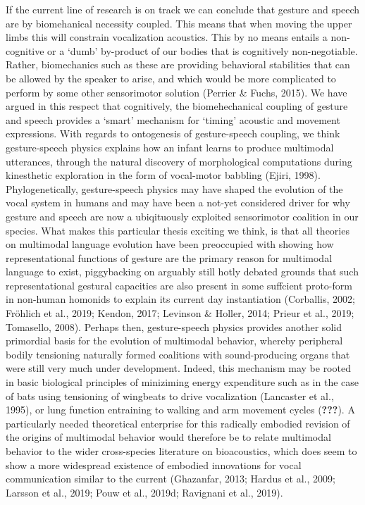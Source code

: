 \documentclass[
  man, noextraspace,floatsintext]{apa6}
\begin{document}
If the current line of research is on track we can conclude that gesture and speech are by biomehanical necessity coupled. This means that when moving the upper limbs this will constrain vocalization acoustics. This by no means entails a non-cognitive or a `dumb' by-product of our bodies that is cognitively non-negotiable. Rather, biomechanics such as these are providing behavioral stabilities that can be allowed by the speaker to arise, and which would be more complicated to perform by some other sensorimotor solution (Perrier \& Fuchs, 2015). We have argued in this respect that cognitively, the biomehechanical coupling of gesture and speech provides a `smart' mechanism for `timing' acoustic and movement expressions. With regards to ontogenesis of gesture-speech coupling, we think gesture-speech physics explains how an infant learns to produce multimodal utterances, through the natural discovery of morphological computations during kinesthetic exploration in the form of vocal-motor babbling (Ejiri, 1998).\\
Phylogenetically, gesture-speech physics may have shaped the evolution of the vocal system in humans and may have been a not-yet considered driver for why gesture and speech are now a ubiqituously exploited sensorimotor coalition in our species. What makes this particular thesis exciting we think, is that all theories on multimodal language evolution have been preoccupied with showing how representational functions of gesture are the primary reason for multimodal language to exist, piggybacking on arguably still hotly debated grounds that such representational gestural capacities are also present in some suffcient proto-form in non-human homonids to explain its current day instantiation (Corballis, 2002; Fröhlich et al., 2019; Kendon, 2017; Levinson \& Holler, 2014; Prieur et al., 2019; Tomasello, 2008). Perhaps then, gesture-speech physics provides another solid primordial basis for the evolution of multimodal behavior, whereby peripheral bodily tensioning naturally formed coalitions with sound-producing organs that were still very much under development. Indeed, this mechanism may be rooted in basic biological principles of miniziming energy expenditure such as in the case of bats using tensioning of wingbeats to drive vocalization (Lancaster et al., 1995), or lung function entraining to walking and arm movement cycles ({\textbf{???}}). A particularly needed theoretical enterprise for this radically embodied revision of the origins of multimodal behavior would therefore be to relate multimodal behavior to the wider cross-species literature on bioacoustics, which does seem to show a more widespread existence of embodied innovations for vocal communication similar to the current (Ghazanfar, 2013; Hardus et al., 2009; Larsson et al., 2019; Pouw et al., 2019d; Ravignani et al., 2019).
\newpage
\end{document}
